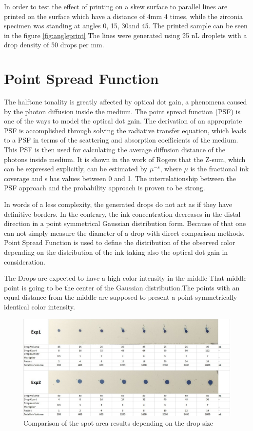 	\bigskip

In order to test the effect of printing on a skew surface to parallel lines are printed on the surface which have a distance of 4mm 4 times, while the zirconia specimen was standing at angles 0\textdegree, 15\textdegree, 30\textdegree and 45\textdegree. The printed sample can be seen in the figure \ref{fig:angleprint}
The lines were generated using 25 nL droplets with a drop density of 50 drops per mm.

\section{Point Spread Function}


The halftone tonality is greatly affected by optical dot gain, a phenomena caused by the photon diffusion inside the medium. The point spread function (PSF) is one of the ways to model the optical dot gain. The derivation of an appropriate PSF is accomplished through solving the radiative transfer equation, which leads to a PSF in terms of the scattering and absorption coefficients of the medium. This PSF is then used for calculating the average diffusion distance of the photons inside medium. It is shown in the work of Rogers that the Z-sum, which can be expressed explicitly, can be estimated by $\mu^{-s}$, where $\mu$ is the fractional ink coverage and s has values between 0 and 1.  The interrelationship  between the PSF  approach and the probability approach is proven to be strong. \citep{rogers2015point}

In words of a less complexity, the generated drops do not act as if they have definitive borders. In the contrary, the ink concentration decreases in the distal direction in a point symmetrical Gaussian distribution form. Because of that one can not simply measure the diameter of a drop with direct comparison methods. Point Spread Function is used to define the distribution of the observed color depending on the distribution of the ink taking also the optical dot gain in consideration.

The Drops are expected to have a high color intensity in the middle That middle point is going to be the center of the Gaussian distribution.The points with an equal distance from the middle are supposed to present a point symmetrically identical color intensity.

\bigskip

\begin{figure}[H]
	\centering
	\includegraphics[width=1\textwidth]{grafiken/psfprint.jpg}
	\caption{Comparison of the spot area results depending on the drop size}
	\label{fig:psfprint}
\end{figure} 

\bigskip

